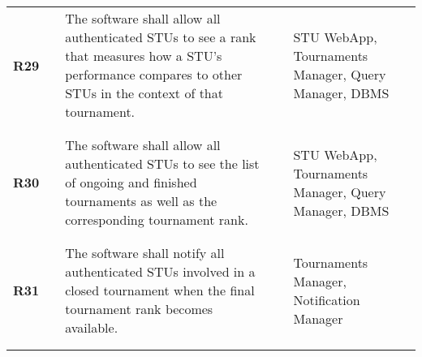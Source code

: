 \begin{longtable}[H]{l l p{6cm} l p{4cm}}
    \textbf{R29}            & \vline & The software shall allow all authenticated STUs to see a rank that measures how a STU's performance compares to other STUs in the context of that tournament.                                                                                                                & \vline &  STU WebApp, Tournaments Manager, Query Manager, DBMS                                    \\          
                            &        &                                                                                                                                                                                                                                                                              &        &                                                                                          \\\hline & & \\ 
    \textbf{R30}            & \vline & The software shall allow all authenticated STUs to see the list of ongoing and finished tournaments as well as the corresponding tournament rank.                                                                                                                            & \vline &  STU WebApp, Tournaments Manager, Query Manager, DBMS                                    \\          
                            &        &                                                                                                                                                                                                                                                                              &        &                                                                                          \\\hline & & \\ 
    \textbf{R31}            & \vline & The software shall notify all authenticated STUs involved in a closed tournament when the final tournament rank becomes available.                                                                                                                                           & \vline &  Tournaments Manager, Notification Manager                                               \\          
                            &        &                                                                                                                                                                                                                                                                              &        &                                                                                          \\\hline & & \\ 

\end{longtable}
